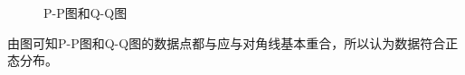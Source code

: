 \documentclass[UTF8]{ctexart}
\begin{document}
\begin{itemize}
		\begin{figure}[H]
			\centering
			\caption{ P-P图和Q-Q图 }
		\end{figure}
		
		\qquad 由图可知P-P图和Q-Q图的数据点都与应与对角线基本重合，所以认为数据符合正态分布。
	\end{itemize}
\end{document}
